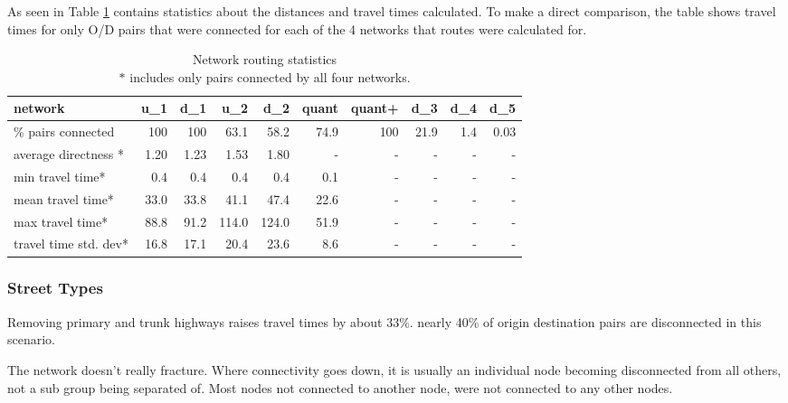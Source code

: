 As seen in Table \ref{table:travel_time_stats} contains statistics about the distances and travel times calculated. To make a direct comparison, the table shows travel times for only O/D pairs that were connected for each of the 4 networks that routes were calculated for.  

\begin{table}[]
\begin{tabular}{lrrrrrrrrr}
\toprule
network                  & u\_1    & d\_1    & u\_2  & d\_2  & quant & quant+ & d\_3 & d\_4 & d\_5 \\ \midrule
\% pairs connected       & 100     & 100     &  63.1 & 58.2  & 74.9  & 100    & 21.9 & 1.4  & 0.03 \\
average directness *     & 1.20    & 1.23    & 1.53  & 1.80  & -     & -      & -    & -    & -    \\
min travel time*         & 0.4     & 0.4     & 0.4   & 0.4   & 0.1   & -      & -    & -    & -    \\
mean travel time*        & 33.0    & 33.8    & 41.1  & 47.4  & 22.6  & -      & -    & -    & -    \\
max travel time*         & 88.8    & 91.2    & 114.0 & 124.0 & 51.9  & -      & -    & -    & -    \\
travel time std. dev*    & 16.8    & 17.1    & 20.4  & 23.6  & 8.6   & -      & -    & -    & -   \\ \bottomrule
\end{tabular}
\caption{Network routing statistics \\ $*$ includes only pairs connected by all four networks.}
\label{table:travel_time_stats}
\end{table}

\subsubsection{Street Types}

Removing primary and trunk highways raises travel times by about 33\%. nearly 40\% of origin destination pairs are disconnected in this scenario. 

The network doesn't really fracture. Where connectivity goes down, it is usually an individual node becoming disconnected from all others, not a sub group being separated of. Most nodes not connected to another node, were not connected to any other nodes. 

